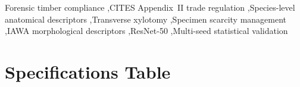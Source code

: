 \documentclass[a4paper,fleqn,12pt]{cas-sc}
\begin{document}
\begin{keywords}
Forensic timber compliance \sep CITES Appendix~II trade regulation \sep Species-level anatomical descriptors \sep Transverse xylotomy \sep Specimen scarcity management \sep IAWA morphological descriptors \sep ResNet-50 \sep Multi-seed statistical validation
\end{keywords}

\maketitle

\section*{Specifications Table}

\noindent
\small
\setlength{\tabcolsep}{5pt}
\renewcommand{\arraystretch}{1.12}
\end{document}
